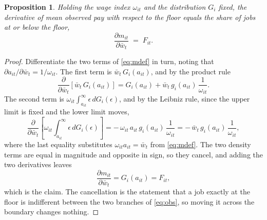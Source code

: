 \documentclass[12pt,leqno]{article}
\newtheorem{proposition}{Proposition}
\begin{document}
\begin{proposition}\label{prop:floor}
Holding the wage index $\omega_{it}$ and the distribution $G_i$ fixed, the derivative of mean observed pay with respect to the floor equals the share of jobs at or below the floor,
\begin{equation}
\frac{\partial m_{it}}{\partial \bar{w}_t} \;=\; F_{it}.
\end{equation}
\end{proposition}

\begin{proof}
Differentiate the two terms of \eqref{eq:mdef} in turn, noting that $\partial a_{it} / \partial \bar{w}_t = 1/\omega_{it}$. The first term is $\bar{w}_t\, G_i(a_{it})$, and by the product rule
\begin{equation}
\frac{\partial}{\partial \bar{w}_t}\left[\bar{w}_t\, G_i(a_{it})\right]
= G_i(a_{it}) + \bar{w}_t\, g_i(a_{it})\,\frac{1}{\omega_{it}} .
\end{equation}
The second term is $\omega_{it}\int_{a_{it}}^{\infty}\epsilon\, dG_i(\epsilon)$, and by the Leibniz rule, since the upper limit is fixed and the lower limit moves,
\begin{equation}
\frac{\partial}{\partial \bar{w}_t}\left[\omega_{it}\int_{a_{it}}^{\infty}\epsilon\, dG_i(\epsilon)\right]
= -\,\omega_{it}\, a_{it}\, g_i(a_{it})\,\frac{1}{\omega_{it}}
= -\,\bar{w}_t\, g_i(a_{it})\,\frac{1}{\omega_{it}},
\end{equation}
where the last equality substitutes $\omega_{it} a_{it} = \bar{w}_t$ from \eqref{eq:mdef}. The two density terms are equal in magnitude and opposite in sign, so they cancel, and adding the two derivatives leaves
\begin{equation}
\frac{\partial m_{it}}{\partial \bar{w}_t} = G_i(a_{it}) = F_{it},
\end{equation}
which is the claim. The cancellation is the statement that a job exactly at the floor is indifferent between the two branches of \eqref{eq:obs}, so moving it across the boundary changes nothing.
\end{proof}
\end{document}
